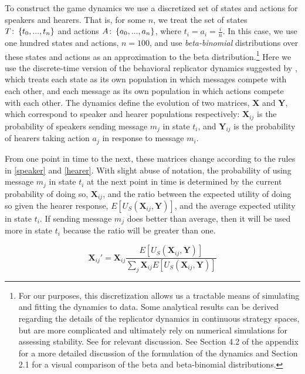 \documentclass[linguex]{sp}
\theoremstyle{definition} \newtheorem{definition}{Definition}
\begin{document}
To construct the game dynamics we use a discretized set of states and actions for speakers and hearers. That is, for some $n$, we treat the set of states $T \colon\thinspace \{t_0, ..., t_n \}$ and actions $A \colon\thinspace \{a_0, ..., a_n \}$, where $t_i = a_i = \frac{i}{n}$. In this case, we use one hundred states and actions, $n=100$, and use \emph{beta-binomial} distributions over these states and actions as an approximation to the beta distribution.\footnote{For our purposes, this discretization allows us a tractable means of simulating and fitting the dynamics to data. Some analytical results can be derived regarding the  details of the replicator dynamics in continuous strategy spaces, but are more complicated  and ultimately rely on numerical simulations for assessing stability. See  \cite{oechssler2002,jager2011} for relevant discussion. See Section 4.2 of the appendix for a more detailed discussion of the formulation of the dynamics and Section 2.1 for a visual comparison of the beta and beta-binomial distributions.} Here we use the discrete-time version of the behavioral replicator dynamics suggested by \cite{hofbauer-huttegger2015}, which treats each state as its own population in which messages compete with each other, and each message as its own population in which actions compete with each other.  The dynamics define the evolution of two matrices, $\mathbf{X}$  and $\mathbf{Y}$,  which correspond to speaker and hearer populations respectively: $\mathbf{X}_{ij}$ is the probability of speakers sending message $m_j$ in state $t_i$, and $\mathbf{Y}_{ij}$ is the probability of hearers taking action $a_j$ in response to message $m_i$.

From one point in time to the next, these matrices change according to the rules in \eqref{speaker} and \eqref{hearer}. With slight abuse of notation, the probability of using message $m_j$ in state $t_i$ at the next point in time is determined by the current probability of doing so, $\mathbf{X}_{ij}$, and the ratio between the expected utility of doing so given the hearer response, $E[U_S(\mathbf{X}_{ij}, \mathbf{Y})]$, and the average expected utility in state $t_i$. If sending message $m_j$ does better than average, then it will be used more in state $t_i$ because the ratio will be greater than one.

\begin{equation}
     \mathbf{X}_{ij}' = \mathbf{X}_{ij}\frac{E[U_S(\mathbf{X}_{ij}, \mathbf{Y})]}{\sum_j \mathbf{X}_{ij} E[U_S(\mathbf{X}_{ij}, \mathbf{Y})]}
     \label{speaker}
\end{equation}
\end{document}
